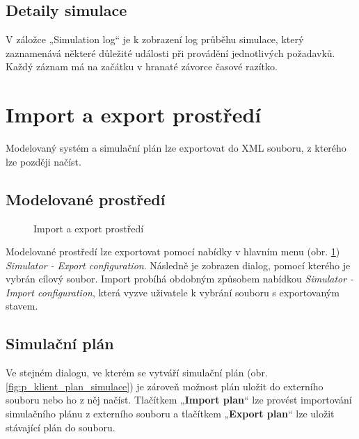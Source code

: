 \documentclass[czech,DP]{thesiskiv}
\begin{document}
\subsection{Detaily simulace}

V záložce „Simulation log“ je k zobrazení log průběhu simulace, který zaznamenává některé důležité události při provádění jednotlivých požadavků. Každý záznam má na začátku v hranaté závorce časové razítko.

\section{Import a export prostředí}

Modelovaný systém a simulační plán lze exportovat do XML souboru, z kterého lze později načíst.

\subsection{Modelované prostředí}

\begin{figure}
\centering
\caption{Import a export prostředí}
\label{fig:p_simulator_import_export}
\end{figure}

Modelované prostředí lze exportovat pomocí nabídky v hlavním menu (obr. \ref{fig:p_simulator_import_export}) \textit{Simulator - Export configuration}. Následně je zobrazen dialog, pomocí kterého je vybrán cílový soubor. Import probíhá obdobným způsobem nabídkou \textit{Simulator - Import configuration}, která vyzve uživatele k vybrání souboru s exportovaným stavem.

\subsection{Simulační plán}

Ve stejném dialogu, ve kterém se vytváří simulační plán (obr. \ref{fig:p_klient_plan_simulace}) je zároveň možnost plán uložit do externího souboru nebo ho z něj načíst. Tlačítkem „\textbf{Import plan}“ lze provést importování simulačního plánu z externího souboru a tlačítkem „\textbf{Export plan}“ lze uložit stávající plán do souboru.

\listoffigures

\listoftables


% 
%

{\raggedright\small

}
\end{document}
